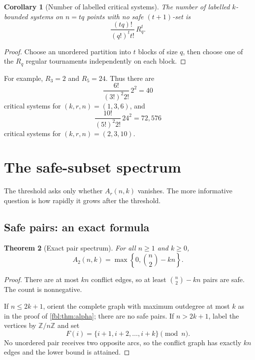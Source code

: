 \documentclass[11pt]{article}
\newtheorem{theorem}{Theorem}[section]
\newtheorem{corollary}[theorem]{Corollary}
\theoremstyle{definition}
\theoremstyle{remark}
\newcommand{\Z}{\mathbb Z}
\begin{document}
\begin{corollary}[Number of labelled critical systems]\label{fbl:cor:critical-count}
The number of labelled $k$-bounded systems on $n=tq$ points with no safe
$(t+1)$-set is
\begin{equation}\label{fbl:eq:critical-count}
  \boxed{
  \frac{(tq)!}{(q!)^t t!}\,R_q^t }.
\end{equation}
\end{corollary}

\begin{proof}
Choose an unordered partition into $t$ blocks of size $q$, then choose one of
the $R_q$ regular tournaments independently on each block.
\end{proof}

For example, $R_3=2$ and $R_5=24$.  Thus there are
\[
 \frac{6!}{(3!)^2 2!}\,2^2=40
\]
critical systems for $(k,r,n)=(1,3,6)$, and
\[
 \frac{10!}{(5!)^2 2!}\,24^2=72{,}576
\]
critical systems for $(k,r,n)=(2,3,10)$.

\section{The safe-subset spectrum}

The threshold asks only whether $A_r(n,k)$ vanishes.  The more informative
question is how rapidly it grows after the threshold.

\subsection{Safe pairs: an exact formula}

\begin{theorem}[Exact pair spectrum]\label{fbl:thm:pairs}
For all $n\ge1$ and $k\ge0$,
\begin{equation}\label{fbl:eq:pairs}
   \boxed{
   A_2(n,k)=\max\left\{0,\binom n2-kn\right\}. }
\end{equation}
\end{theorem}

\begin{proof}
There are at most $kn$ conflict edges, so at least
$\binom n2-kn$ pairs are safe.  The count is nonnegative.

If $n\le2k+1$, orient the complete graph with maximum outdegree at most $k$
as in the proof of \cref{fbl:thm:alpha}; there are no safe pairs.  If
$n>2k+1$, label the vertices by $\Z/n\Z$ and set
\[
       F(i)=\{i+1,i+2,\ldots,i+k\}\pmod n.
\]
No unordered pair receives two opposite arcs, so the conflict graph has
exactly $kn$ edges and the lower bound is attained.
\end{proof}
\end{document}
